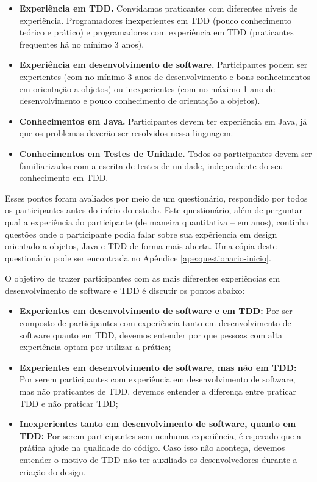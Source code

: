 \begin{itemize}
	\item \textbf{Experiência em TDD.} Convidamos praticantes com diferentes
	níveis de experiência. Programadores inexperientes em TDD (pouco conhecimento teórico e prático)
	e programadores com experiência em TDD (praticantes frequentes há no mínimo 3 anos).
	
	\item \textbf{Experiência em desenvolvimento de software.} Participantes podem ser
	experientes (com no mínimo 3 anos de desenvolvimento e bons conhecimentos em orientação a objetos) ou 
	inexperientes (com no máximo 1 ano de desenvolvimento e pouco conhecimento de orientação a objetos).

	\item \textbf{Conhecimentos em Java.} 
	Participantes devem ter experiência em Java, já que os problemas deverão ser resolvidos
	nessa linguagem.	
	
	\item \textbf{Conhecimentos em Testes de Unidade.} Todos os participantes devem ser
	familiarizados com a escrita de testes de unidade, independente do seu conhecimento
	em TDD.

\end{itemize}

Esses pontos foram avaliados por meio de um questionário, 
respondido por todos os participantes antes do início do estudo. 
Este questionário, além de perguntar qual a experiência
do participante (de maneira quantitativa -- em anos), 
continha questões onde o participante
podia falar sobre sua expêriencia em design orientado a objetos,
Java e TDD de forma mais aberta.
Uma cópia deste questionário
pode ser encontrada no Apêndice \ref{ape:questionario-inicio}.

O objetivo de trazer participantes com as mais diferentes experiências em desenvolvimento
de software e TDD é discutir os pontos abaixo:

\begin{itemize}
	\item \textbf{Experientes em desenvolvimento de software e em TDD:} 
	Por ser composto de participantes com experiência tanto
	em desenvolvimento de software quanto em TDD, devemos entender por que
	pessoas com alta experiência optam por utilizar a prática;
	
	\item \textbf{Experientes em desenvolvimento de software, mas não em TDD:} 
	Por serem participantes com experiência em desenvolvimento
	de software, mas não praticantes de TDD, devemos entender a diferença entre
	praticar TDD e não praticar TDD;
		
	\item \textbf{Inexperientes tanto em desenvolvimento de software, quanto em TDD:} 
	Por serem participantes sem nenhuma experiência, é esperado que
	a prática ajude na qualidade do código. Caso isso não aconteça, devemos
	entender o motivo de TDD não ter auxiliado os desenvolvedores durante a 
	criação do design.
\end{itemize}


